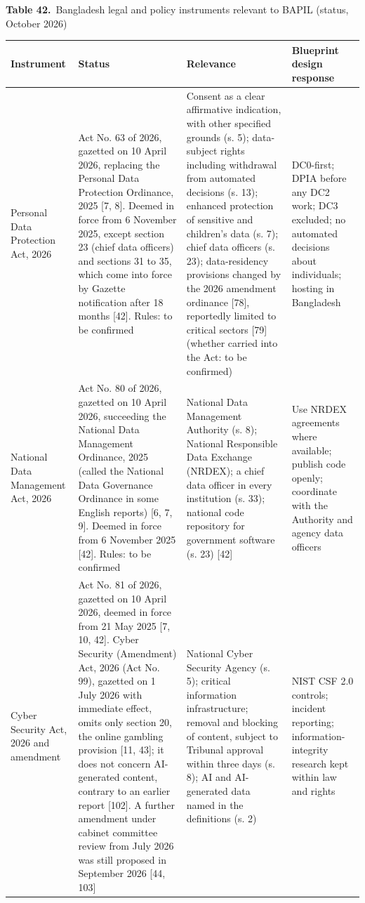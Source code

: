 \documentclass[border=10pt]{standalone}
\begin{document}
\begin{minipage}{17cm}
{\large\bfseries Table 42.}\ {\large Bangladesh legal and policy instruments relevant to BAPIL (status, October 2026)}\par\vspace{7pt}
\small
{}
\begin{tabularx}{\linewidth}{@{}>{\hsize=0.735\hsize\raggedright\arraybackslash}X>{\hsize=1.347\hsize\raggedright\arraybackslash}X>{\hsize=1.020\hsize\raggedright\arraybackslash}X>{\hsize=0.898\hsize\raggedright\arraybackslash}X@{}}
\arrayrulecolor{bapilrule}\toprule
\rowcolor{white}\textbf{Instrument} & \textbf{Status} & \textbf{Relevance} & \textbf{Blueprint design response} \\
\midrule
Personal Data Protection Act, 2026 & Act No. 63 of 2026, gazetted on 10 April 2026, replacing the Personal Data Protection Ordinance, 2025 [7, 8]. Deemed in force from 6 November 2025, except section 23 (chief data officers) and sections 31 to 35, which come into force by Gazette notification after 18 months [42]. Rules: to be confirmed & Consent as a clear affirmative indication, with other specified grounds (s. 5); data-subject rights including withdrawal from automated decisions (s. 13); enhanced protection of sensitive and children’s data (s. 7); chief data officers (s. 23); data-residency provisions changed by the 2026 amendment ordinance [78], reportedly limited to critical sectors [79] (whether carried into the Act: to be confirmed) & DC0-first; DPIA before any DC2 work; DC3 excluded; no automated decisions about individuals; hosting in Bangladesh \\
National Data Management Act, 2026 & Act No. 80 of 2026, gazetted on 10 April 2026, succeeding the National Data Management Ordinance, 2025 (called the National Data Governance Ordinance in some English reports) [6, 7, 9]. Deemed in force from 6 November 2025 [42]. Rules: to be confirmed & National Data Management Authority (s. 8); National Responsible Data Exchange (NRDEX); a chief data officer in every institution (s. 33); national code repository for government software (s. 23) [42] & Use NRDEX agreements where available; publish code openly; coordinate with the Authority and agency data officers \\
Cyber Security Act, 2026 and amendment & Act No. 81 of 2026, gazetted on 10 April 2026, deemed in force from 21 May 2025 [7, 10, 42]. Cyber Security (Amendment) Act, 2026 (Act No. 99), gazetted on 1 July 2026 with immediate effect, omits only section 20, the online gambling provision [11, 43]; it does not concern AI-generated content, contrary to an earlier report [102]. A further amendment under cabinet committee review from July 2026 was still proposed in September 2026 [44, 103] & National Cyber Security Agency (s. 5); critical information infrastructure; removal and blocking of content, subject to Tribunal approval within three days (s. 8); AI and AI-generated data named in the definitions (s. 2) & NIST CSF 2.0 controls; incident reporting; information-integrity research kept within law and rights \\

\end{tabularx}
\end{minipage}
\end{document}
